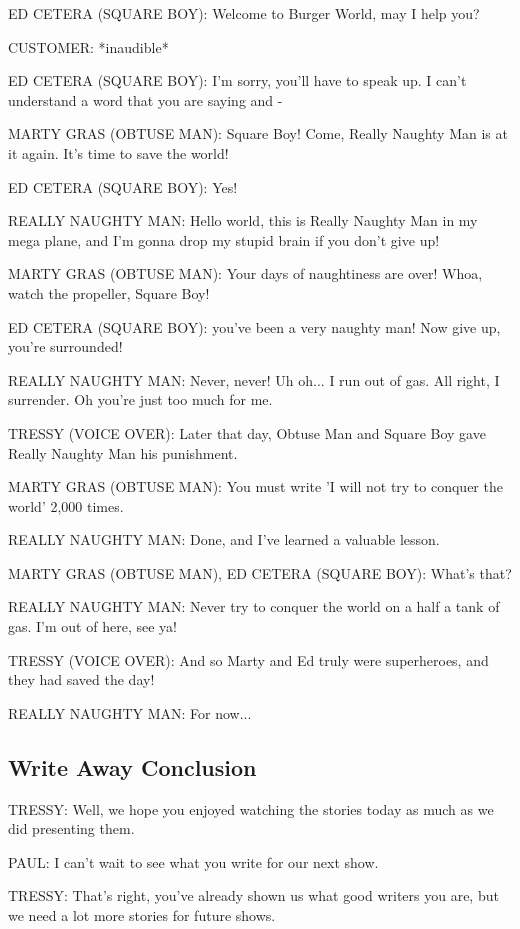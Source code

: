 ED CETERA (SQUARE BOY):
Welcome to Burger World, may I help you?

CUSTOMER:
*inaudible*

ED CETERA (SQUARE BOY):
I'm sorry, you'll have to speak up.
I can't understand a word that you are saying and -

MARTY GRAS (OBTUSE MAN):
Square Boy!
Come, Really Naughty Man is at it again.
It's time to save the world!

ED CETERA (SQUARE BOY):
Yes!

REALLY NAUGHTY MAN:
Hello world, this is Really Naughty Man in my mega plane, and I'm gonna drop my stupid brain if you don't give up!

MARTY GRAS (OBTUSE MAN):
Your days of naughtiness are over!
Whoa, watch the propeller, Square Boy!

ED CETERA (SQUARE BOY):
you've been a very naughty man!
Now give up, you're surrounded!

REALLY NAUGHTY MAN:
Never, never!
Uh oh... I run out of gas.
All right, I surrender.
Oh you're just too much for me.

TRESSY (VOICE OVER):
Later that day, Obtuse Man and Square Boy gave Really Naughty Man his punishment.

MARTY GRAS (OBTUSE MAN):
You must write 'I will not try to conquer the world' 2,000 times.

REALLY NAUGHTY MAN:
Done, and I've learned a valuable lesson.

MARTY GRAS (OBTUSE MAN), ED CETERA (SQUARE BOY):
What's that?

REALLY NAUGHTY MAN:
Never try to conquer the world on a half a tank of gas.
I'm out of here, see ya!

TRESSY (VOICE OVER):
And so Marty and Ed truly were superheroes, and they had saved the day!

REALLY NAUGHTY MAN:
For now...

\subsection{Write Away Conclusion}

TRESSY:
Well, we hope you enjoyed watching the stories today as much as we did presenting them.

PAUL:
I can't wait to see what you write for our next show.

TRESSY:
That's right, you've already shown us what good writers you are, but we need a lot more stories for future shows.


